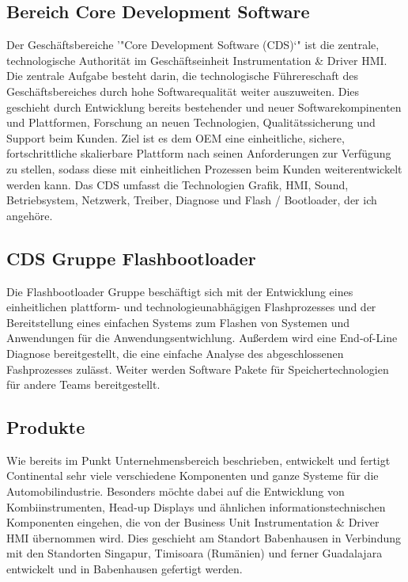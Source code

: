 \subsection{Bereich Core Development Software}
Der Geschäftsbereiche '"Core Development Software (CDS)`" ist die zentrale, technologische Authorität im Geschäftseinheit Instrumentation \& Driver HMI. Die zentrale Aufgabe besteht darin, die technologische Führereschaft des Geschäftsbereiches durch hohe Softwarequalität weiter auszuweiten. Dies geschieht durch Entwicklung bereits bestehender und neuer Softwarekompinenten und Plattformen, Forschung an neuen Technologien, Qualitätssicherung und Support beim Kunden.
Ziel ist es dem OEM eine einheitliche, sichere, fortschrittliche skalierbare Plattform nach seinen Anforderungen zur Verfügung zu stellen, sodass diese mit einheitlichen Prozessen beim Kunden weiterentwickelt werden kann.
Das CDS umfasst die Technologien Grafik, HMI, Sound, Betriebsystem, Netzwerk, Treiber, Diagnose und Flash / Bootloader, der ich angehöre. 

\subsection{CDS Gruppe Flashbootloader}
Die Flashbootloader Gruppe beschäftigt sich mit der Entwicklung eines einheitlichen plattform- und technologieunabhägigen Flashprozesses und der Bereitstellung eines einfachen Systems zum Flashen von Systemen und Anwendungen für die Anwendungsentwichlung. 
Außerdem wird eine End-of-Line Diagnose bereitgestellt, die eine einfache Analyse des abgeschlossenen Fashprozesses zulässt. 
Weiter werden Software Pakete für Speichertechnologien für andere Teams bereitgestellt. 

\subsection{Produkte}


Wie bereits im Punkt Unternehmensbereich beschrieben, entwickelt und fertigt Continental sehr viele verschiedene Komponenten und ganze Systeme für die Automobilindustrie. 
Besonders möchte dabei auf die Entwicklung von Kombiinstrumenten, Head-up Displays und ähnlichen informationstechnischen Komponenten eingehen, die von der Business Unit Instrumentation \& Driver HMI übernommen wird. Dies geschieht am Standort Babenhausen in Verbindung mit den Standorten Singapur, Timisoara (Rumänien) und ferner Guadalajara entwickelt und in Babenhausen gefertigt werden. 



